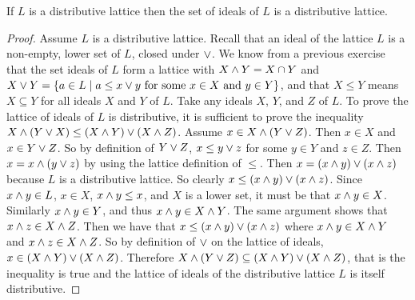 
\begin{theorem*}
If $L$ is a distributive lattice then the set of ideals of $L$ is a distributive lattice.
\end{theorem*}

\begin{proof}
Assume $L$ is a distributive lattice.
Recall that an ideal of the lattice $L$ is a non-empty, lower set of $L$, closed under $\vee$.
We know from a previous exercise that the set ideals of $L$ form a lattice with $X \wedge Y = X \cap Y$ and $X \vee Y = \{ a \in L \mid a \leq x \vee y \text{ for some } x \in X \text{ and } y \in Y \}$, and that $X\leq Y$ means $X\subseteq Y$ for all ideals $X$ and $Y$ of $L$.
Take any ideals $X$, $Y$, and $Z$ of $L$.
To prove the lattice of ideals of $L$ is distributive, it is sufficient to prove the inequality
$X\wedge (Y \vee X) \leq (X\wedge Y) \vee (X\wedge Z)$.
Assume $x\in X \wedge (Y\vee Z)$.
Then $x \in X$ and $x \in Y \vee Z$.
So by definition of $Y \vee Z$, $x \leq y \vee z$ for some $y \in Y$ and $z \in Z$.
Then $x = x \wedge (y \vee z)$ by using the lattice definition of $\leq$.
Then $x = (x \wedge y) \vee (x\wedge z)$ because $L$ is a distributive lattice.
So clearly $x \leq (x \wedge y) \vee (x\wedge z)$.
Since $x \wedge y \in L$, $x \in X$, $x \wedge y \leq x$, and $X$ is a lower set, it must be that $x \wedge y \in X$.
Similarly $x\wedge y \in Y$, and thus $x\wedge y \in X \wedge Y$.
The same argument shows that $x \wedge z \in X \wedge Z$.
Then we have that $x \leq (x \wedge y) \vee (x\wedge z)$ where $x \wedge y \in X \wedge Y$ and $x \wedge z \in X \wedge Z$.
So by definition of $\vee$ on the lattice of ideals, $x \in (X\wedge Y) \vee (X\wedge Z)$.
Therefore $X \wedge (Y\vee Z) \subseteq (X\wedge Y) \vee (X\wedge Z)$, that is the inequality is true and the lattice of ideals of the distributive lattice $L$ is itself distributive.
\end{proof}

